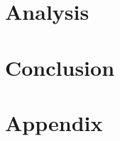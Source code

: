 \documentclass{article}
\begin{document}
\section{Analysis}

















\section{Conclusion}






































\appendix
\section{Appendix}
\end{document}
